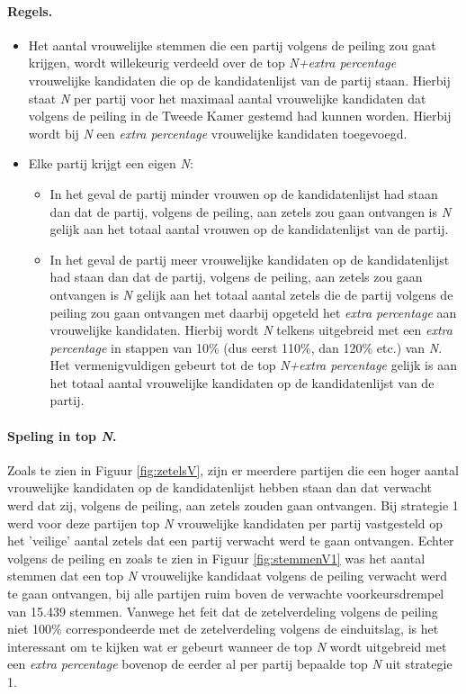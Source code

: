 \paragraph{Regels.}
\begin{itemize}
	\item
Het aantal vrouwelijke stemmen die een partij volgens de peiling zou gaat krijgen, wordt willekeurig verdeeld over de top \textit{N+extra percentage} vrouwelijke kandidaten die op de kandidatenlijst van de partij staan. Hierbij staat \textit{N} per partij voor het maximaal aantal vrouwelijke kandidaten dat volgens de peiling in de Tweede Kamer gestemd had kunnen worden. Hierbij wordt bij \textit{N} een \textit{extra percentage} vrouwelijke kandidaten toegevoegd.\\
 	\item
Elke partij krijgt een eigen \textit{N}:
	\begin{itemize}
		\item
In het geval de partij minder vrouwen op de kandidatenlijst had staan dan dat de partij, volgens de peiling, aan zetels zou gaan ontvangen is \textit{N} gelijk aan het totaal aantal vrouwen op de kandidatenlijst van de partij.
		\item
In het geval de partij meer vrouwelijke kandidaten op de kandidatenlijst had staan dan dat de partij, volgens de peiling, aan zetels zou gaan ontvangen is \textit{N} gelijk aan het totaal aantal zetels die de partij volgens de peiling zou gaan ontvangen met daarbij opgeteld het \textit{extra percentage} aan vrouwelijke kandidaten. Hierbij wordt \textit{N} telkens uitgebreid met een \textit{extra percentage} in stappen van 10\% (dus eerst 110\%, dan 120\% etc.) van \textit{N}. Het vermenigvuldigen gebeurt tot de top \textit{N+extra percentage} gelijk is aan het totaal aantal vrouwelijke kandidaten op de kandidatenlijst van de partij. 
\end{itemize} 	
\end{itemize}

\paragraph{Speling in top \textit{N}.}
Zoals te zien in Figuur \ref{fig:zetelsV}, zijn er meerdere partijen die een hoger aantal vrouwelijke kandidaten op de kandidatenlijst hebben staan dan dat verwacht werd dat zij,  volgens de peiling, aan zetels zouden gaan ontvangen. Bij strategie 1 werd voor deze partijen top \textit{N} vrouwelijke kandidaten per partij vastgesteld op het 'veilige' aantal zetels dat een partij verwacht werd te gaan ontvangen. Echter volgens de peiling en zoals te zien in Figuur \ref{fig:stemmenV1} was het aantal stemmen dat een top \textit{N} vrouwelijke kandidaat volgens de peiling verwacht werd te gaan ontvangen, bij alle partijen ruim boven de verwachte voorkeursdrempel van 15.439 stemmen. Vanwege het feit dat de zetelverdeling volgens de peiling niet 100\% correspondeerde met de zetelverdeling volgens de einduitslag, is het interessant om te kijken wat er gebeurt wanneer de top \textit{N} wordt uitgebreid met een \textit{extra percentage} bovenop de eerder al per partij bepaalde top \textit{N} uit strategie 1. 

